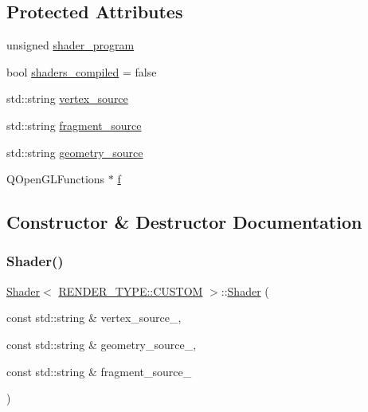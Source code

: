 \subsection*{Protected Attributes}
\begin{DoxyCompactItemize}
\item 
unsigned \mbox{\hyperlink{classShader_3_01RENDER__TYPE_1_1CUSTOM_01_4_a5baec51d258afd0d116d82cace52eace}{shader\+\_\+program}}
\item 
bool \mbox{\hyperlink{classShader_3_01RENDER__TYPE_1_1CUSTOM_01_4_a80cb5fdd63c57881cdf2b2dbb18e215e}{shaders\+\_\+compiled}} = false
\item 
std\+::string \mbox{\hyperlink{classShader_3_01RENDER__TYPE_1_1CUSTOM_01_4_a95f6c6193de907392601733706dd3e3a}{vertex\+\_\+source}}
\item 
std\+::string \mbox{\hyperlink{classShader_3_01RENDER__TYPE_1_1CUSTOM_01_4_a1f18c00fdbb9e07271d535d747a95d17}{fragment\+\_\+source}}
\item 
std\+::string \mbox{\hyperlink{classShader_3_01RENDER__TYPE_1_1CUSTOM_01_4_a6e28c4178c7be2543b73597c11362b7a}{geometry\+\_\+source}}
\item 
Q\+Open\+G\+L\+Functions $\ast$ \mbox{\hyperlink{classShader_3_01RENDER__TYPE_1_1CUSTOM_01_4_acc6be46282f7d931999492f7b8d1b59a}{f}}
\end{DoxyCompactItemize}


\subsection{Constructor \& Destructor Documentation}
\mbox{\label{classShader_3_01RENDER__TYPE_1_1CUSTOM_01_4_a8238c3e1a3a96e7ed2b1777a340d7947}} 
\subsubsection{\texorpdfstring{Shader()}{Shader()}\hspace{0.1cm}{\footnotesize\ttfamily [1/8]}}
{\footnotesize\ttfamily \mbox{\hyperlink{classShader}{Shader}}$<$ \mbox{\hyperlink{shader__class_8hpp_a24e288e18eb7b6e01de7565001fedb60a72baef04098f035e8a320b03ad197818}{R\+E\+N\+D\+E\+R\+\_\+\+T\+Y\+P\+E\+::\+C\+U\+S\+T\+OM}} $>$\+::\mbox{\hyperlink{classShader}{Shader}} (\begin{DoxyParamCaption}\item[{const std\+::string \&}]{vertex\+\_\+source\+\_\+,  }\item[{const std\+::string \&}]{geometry\+\_\+source\+\_\+,  }\item[{const std\+::string \&}]{fragment\+\_\+source\+\_\+ }\end{DoxyParamCaption})\hspace{0.3cm}{\ttfamily [inline]}}

